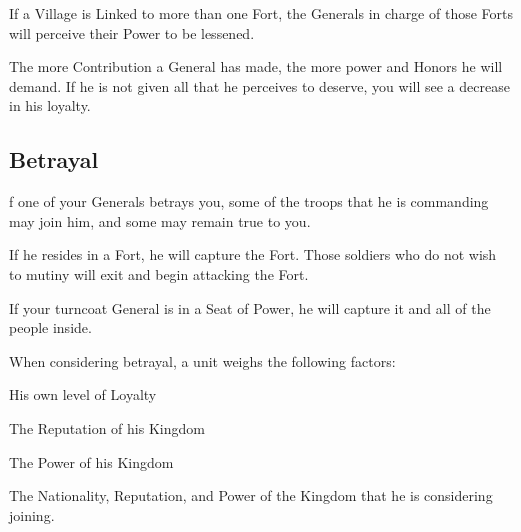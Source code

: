 If a Village is Linked to more than one Fort, the Generals in charge of those Forts will perceive their Power to be lessened.

The more Contribution a General has made, the more power and Honors he will demand. If he is not given all that he perceives to deserve, you will see a decrease in his loyalty.

\subsection{\textsf{Betrayal}}


f one of your Generals betrays you, some of the troops that he is commanding may join him, and some may remain true to you.

If he resides in a Fort, he will capture the Fort. Those soldiers who do not wish to mutiny will exit and begin attacking the Fort.

If your turncoat General is in a Seat of Power, he will capture it and all of the people inside.

When considering betrayal, a unit weighs the following factors:

\begin{changemargin}{.5cm}{0cm}
His own level of Loyalty

The Reputation of his Kingdom

The Power of his Kingdom

The Nationality, Reputation, and Power of the Kingdom that he is considering joining.
\end{changemargin}